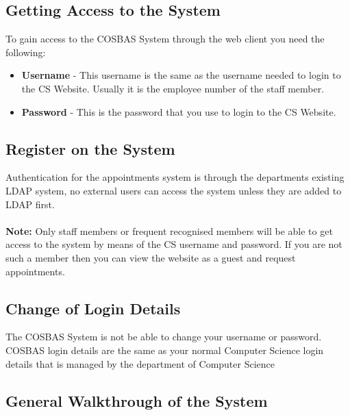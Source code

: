 \subsection{Getting Access to the System}
To gain access to the COSBAS System through the web client you need the following:
	\begin{itemize}
		\item{\textbf{Username} - This username is the same as the username needed to login to the CS Website. 
					   Usually it is the employee number of the staff member.} 
		\item{\textbf{Password} - This is the password that you use to login to the CS Website.}
	\end{itemize}

\subsection{Register on the System}
Authentication for the appointments system is through the departments existing LDAP system, no external users can access the system unless they are added to LDAP first. \\
\\
\textbf{Note:} Only staff members or frequent recognised members will be able to get access to the system by means of the CS username and password. If you are not such a member then you can view the website as a guest and request appointments.

\subsection{Change of Login Details}
The COSBAS System is not be able to change your username or password. COSBAS login details are the same as your normal Computer Science login details that is managed by the department of Computer Science

\subsection{General Walkthrough of the System}
